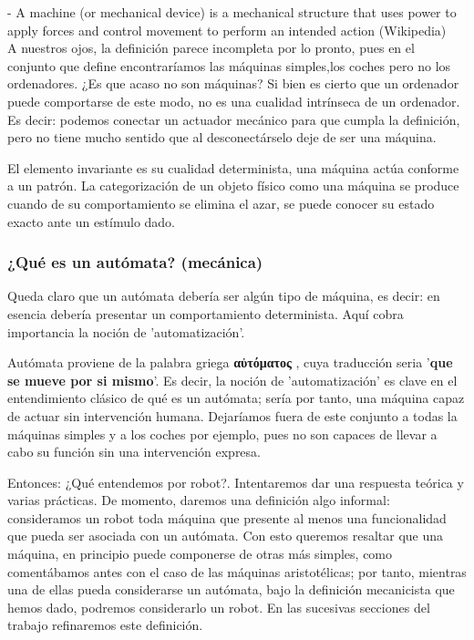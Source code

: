 - A machine (or mechanical device) is a mechanical structure that uses power to apply forces and control movement to perform an intended action (Wikipedia) \\

A nuestros ojos, la definición parece incompleta por lo pronto, pues en el conjunto que define encontraríamos las máquinas simples,los coches pero no los ordenadores. ¿Es que acaso no son máquinas? Si bien es cierto que un ordenador puede comportarse de este modo, no es una cualidad intrínseca de un ordenador. Es decir: podemos conectar un actuador mecánico para que cumpla la definición, pero no tiene mucho sentido que al desconectárselo deje de ser una máquina. 

\vspace{10px}

El elemento invariante es su cualidad determinista, una máquina actúa conforme a un patrón. La categorización de un objeto físico como una máquina se produce cuando de su comportamiento se elimina el azar, se puede conocer su estado exacto ante un estímulo dado.



\subsubsection{¿Qué es un autómata? (mecánica)}

Queda claro que un autómata debería ser algún tipo de máquina, es decir: en esencia debería presentar un comportamiento determinista. Aquí cobra importancia la noción de 'automatización'.

\vspace{10px}

Autómata proviene de la palabra griega \textbf{\textgreek{αὐτόματος}} , cuya traducción seria '\textbf{que se mueve por si mismo}'. Es decir, la noción de 'automatización' es clave en el entendimiento clásico de  qué es un autómata; sería por tanto, una máquina capaz de actuar sin intervención humana. Dejaríamos fuera de este conjunto a todas la máquinas simples y a los coches por ejemplo, pues no son capaces de llevar a cabo su función sin una intervención expresa.

\vspace{10px}

Entonces: ¿Qué entendemos por robot?. Intentaremos dar una respuesta teórica y varias prácticas. De momento, daremos una definición algo informal: consideramos un robot toda máquina que presente al menos una funcionalidad que pueda ser asociada con un autómata. Con esto queremos resaltar que una máquina, en principio puede componerse de otras más simples, como comentábamos antes con el caso de las máquinas aristotélicas; por tanto, mientras una de ellas pueda considerarse un autómata, bajo la definición mecanicista que hemos dado, podremos considerarlo un robot. En las sucesivas secciones del trabajo refinaremos este definición.

\newpage
